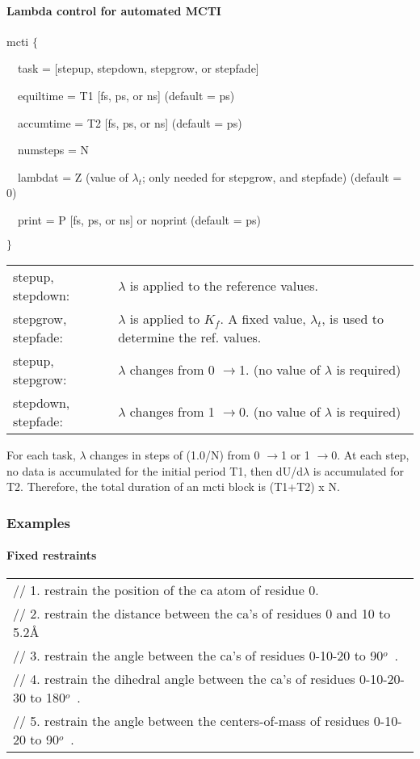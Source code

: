 \paragraph*{Lambda control for automated MCTI}

mcti $\{$

~~task = [stepup, stepdown, stepgrow, or stepfade]

~~equiltime = T1 [fs, ps, or ns] (default = ps)

~~accumtime = T2 [fs, ps, or ns] (default = ps)

~~numsteps = N

~~lambdat = Z (value of $\lambda _{t}$; only needed for stepgrow, and
stepfade) (default = 0)

~~print = P [fs, ps, or ns] or noprint (default = ps)

$\}\medskip $

\begin{tabular}{ll}
stepup, stepdown: & $\lambda $ is applied to the reference values. \\ 
stepgrow, stepfade: & $\lambda $ is applied to $K_{f}$. A fixed value, $%
\lambda _{t}$, is used to determine the ref. values. \\ 
stepup, stepgrow: & $\lambda $ changes from 0 $\rightarrow $1. (no value of $%
\lambda $ is required) \\ 
stepdown, stepfade: & $\lambda $ changes from 1 $\rightarrow $0. (no value
of $\lambda $ is required)\medskip
\end{tabular}

For each task, $\lambda $ changes in steps of (1.0/N) from 0 $\rightarrow $1
or 1 $\rightarrow $0. At each step, no data is accumulated for the initial
period T1, then dU/d$\lambda $ is accumulated for T2. Therefore, the total
duration of an mcti block is (T1+T2) x N.

\subsubsection{Examples}

\paragraph*{Fixed restraints}

\begin{tabular}{l}
{\footnotesize // 1. restrain the position of the ca atom of residue 0.} \\ 
{\footnotesize // 2. restrain the distance between the ca's of residues 0
and 10 to 5.2\AA } \\ 
{\footnotesize // 3. restrain the angle between the ca's of residues 0-10-20
to 90}$^{o}${\footnotesize \ .} \\ 
{\footnotesize // 4. restrain the dihedral angle between the ca's of
residues 0-10-20-30 to 180}$^{o}${\footnotesize \ .} \\ 
{\footnotesize // 5. restrain the angle between the centers-of-mass of
residues 0-10-20 to 90}$^{o}${\footnotesize \ .}
\end{tabular}


